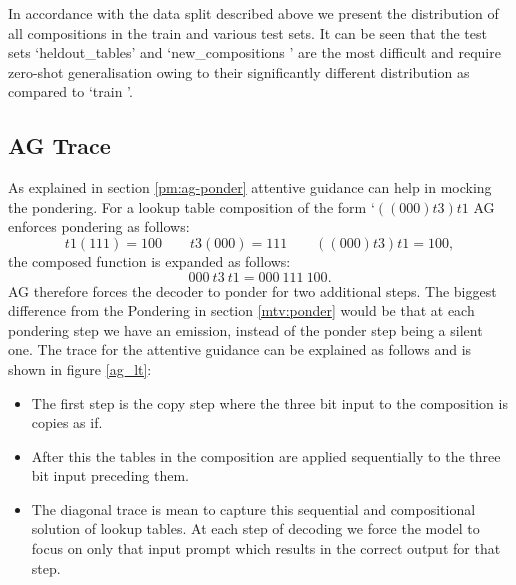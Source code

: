 In accordance with the data split described above we present the distribution of all compositions in the train and various test sets. It can be seen that the test sets \lq heldout\_tables\rq{} and \lq new\_compositions \rq{} are the most difficult and require zero-shot generalisation owing to their significantly different distribution as compared to \lq train \rq{}.

\subsection{AG Trace}
As explained in section \ref{pm:ag-ponder} attentive guidance can help in mocking the pondering. For a lookup table composition of the form \lq $((000)t3)t1$ AG enforces pondering as follows:
\begin{equation}
t1(111) = 100 \qquad t3(000) = 111 \qquad ((000)t3)t1 = 100,
\end{equation}
the composed function is expanded as follows:
\begin{equation}
000\ t3\ t1 = 000\ 111\ 100.
\end{equation}
AG therefore forces the decoder to ponder for two additional steps. The biggest difference from the Pondering in section \ref{mtv:ponder} would be that at each pondering step we have an emission, instead of the ponder step being a silent one. The trace for the attentive guidance can be explained as follows and is shown in figure \ref{ag_lt}:
\begin{itemize}
	\item The first step is the copy step where the three bit input to the composition is copies as if.
	\item After this the tables in the composition are applied sequentially to the three bit input preceding them.
	\item The diagonal trace is mean to capture this sequential and compositional solution of lookup tables. At each step of decoding we force the model to focus on only that input prompt which results in the correct output for that step.
\end{itemize}

